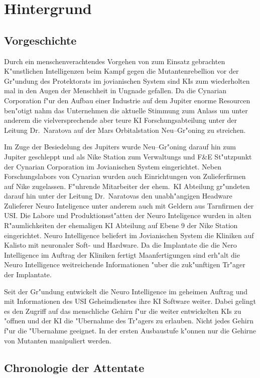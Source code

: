 \section{Hintergrund}

\subsection{Vorgeschichte}

Durch ein menschenverachtendes Vorgehen von zum Einsatz gebrachten K"unstlichen Intelligenzen beim Kampf gegen die Mutantenrebellion vor der Gr"undung des Protektorats im jovianischen System sind KIs zum wiederholten mal in den Augen der Menschheit in Ungnade gefallen. Da die Cynarian Corporation f"ur den Aufbau einer Industrie auf dem Jupiter enorme Resourcen ben"otigt nahm das Unternehmen die aktuelle Stimmung zum Anlass um unter anderem die vielversprechende aber teure KI Forschungsabteilung unter der Leitung Dr.~Naratova auf der Mars Orbitalstation Neu--Gr"oning zu streichen.

Im Zuge der Besiedelung des Jupiters wurde Neu--Gr"oning darauf hin zum Jupiter geschleppt und als Nike Station zum Verwaltungs und F\&E St"utzpunkt der Cynarian Corporation im Jovianischen System eingerichtet. Neben Forschungslabors von Cynarian wurden auch Einrichtungen von Zulieferfirmen auf Nike zugelassen. F"uhrende Mitarbeiter der ehem.~KI Abteilung gr"undeten darauf hin unter der Leitung Dr.~Naratovas den unabh"angigen Headware Zulieferer Neuro Inteligence unter anderem auch mit Geldern aus Tarnfirmen der USI. Die Labore und Produktionsst"atten der Neuro Inteligence wurden in alten R"aumlichkeiten der ehemaligen KI Abteilung auf Ebene 9 der Nike Station eingerichtet. Neuro Intelligence beliefert im Jovianischen System die Kliniken auf Kalisto mit neuronaler Soft- und Hardware. Da die Implantate die die Nero Intelligence im Auftrag der Kliniken fertigt Ma\3anfertigungen sind erh"alt die Neuro Intelligence weitreichende Informationen "uber die zuk"unftigen Tr"ager der Implantate.

Seit der Gr"undung entwickelt die Neuro Intelligence im geheimen Auftrag und mit Informationen des USI Geheimdienstes ihre KI Software weiter. Dabei gelingt es den Zugriff auf das menschliche Gehirn f"ur die weiter entwickelten KIs zu "offnen und der KI die "Ubernahme des Tr"agers zu erlauben. Nicht jedes Gehirn f"ur die "Ubernahme geeignet. In der ersten Ausbaustufe k"onnen nur die Gehirne von Mutanten manipuliert werden.

\subsection{Chronologie der Attentate}

